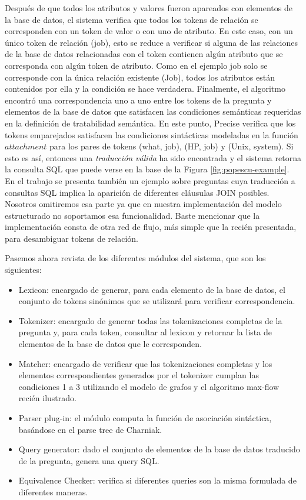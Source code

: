 Después de que todos los atributos y valores fueron apareados con elementos de la base de datos, el sistema verifica que todos los tokens de relación se corresponden con un token de valor o con uno de atributo. En este caso, con un único token de relación (job), esto se reduce a verificar si alguna de las relaciones de la base de datos relacionadas con el token contienen algún atributo que se corresponda con algún token de atributo. Como en el ejemplo job solo se corresponde con la única relación existente (Job), todos los atributos están contenidos por ella y la condición se hace verdadera. Finalmente, el algoritmo encontró una correspondencia uno a uno entre los tokens de la pregunta y elementos de la base de datos que satisfacen las condiciones semánticas requeridas en la definición de tratabilidad semántica. En este punto, Precise verifica que los tokens emparejados satisfacen las condiciones sintácticas modeladas en la función $attachment$ para los pares de tokens (what, job), (HP, job) y (Unix, system). Si esto es así, entonces una \textit{traducción válida} ha sido encontrada y el sistema retorna la consulta SQL que puede verse en la base de la Figura \ref{fig:popescu-example}. En el trabajo se presenta también un ejemplo sobre preguntas cuya traducción a consultas SQL implica la aparición de diferentes cláusulas JOIN posibles. Nosotros omitiremos esa parte ya que en nuestra implementación del modelo estructurado no soportamos esa funcionalidad. Baste mencionar que la implementación consta de otra red de flujo, más simple que la recién presentada, para desambiguar tokens de relación.

\bigskip

Pasemos ahora revista de los diferentes módulos del sistema,  que son los siguientes:

\begin{itemize}
  \item Lexicon: encargado de generar, para cada elemento de la base de datos, el conjunto de tokens sinónimos que se utilizará para verificar correspondencia.
  \item Tokenizer: encargado de generar todas las tokenizaciones completas de la pregunta y, para cada token, consultar al lexicon y retornar la lista de elementos de la base de datos que le corresponden.
  \item Matcher: encargado de verificar que las tokenizaciones completas y los elementos correspondientes generados por el tokenizer cumplan las condiciones 1 a 3 utilizando el modelo de grafos y el algoritmo max-flow recién ilustrado.
  \item Parser plug-in: el módulo computa la función de asociación sintáctica, basándose en el parse tree de Charniak.
  \item Query generator: dado el conjunto de elementos de la base de datos traducido de la pregunta, genera una query SQL.
  \item Equivalence Checker: verifica si diferentes queries son la misma formulada de diferentes maneras.
\end{itemize}

